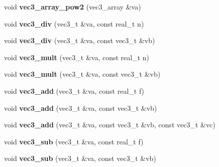 \begin{DoxyCompactItemize}
\item 
void {\bfseries vec3\+\_\+array\+\_\+pow2} (vec3\+\_\+array \&va)\hypertarget{namespacekukadu_a650138c56420ea9479f90f0b67767956}{}\label{namespacekukadu_a650138c56420ea9479f90f0b67767956}

\item 
void {\bfseries vec3\+\_\+div} (vec3\+\_\+t \&va, const real\+\_\+t n)\hypertarget{namespacekukadu_a743bd59f2d8a3dc59e907c7280362eb6}{}\label{namespacekukadu_a743bd59f2d8a3dc59e907c7280362eb6}

\item 
void {\bfseries vec3\+\_\+div} (vec3\+\_\+t \&va, const vec3\+\_\+t \&vb)\hypertarget{namespacekukadu_a9405d0487db8c6245a8cee6c0093b7a2}{}\label{namespacekukadu_a9405d0487db8c6245a8cee6c0093b7a2}

\item 
void {\bfseries vec3\+\_\+mult} (vec3\+\_\+t \&va, const real\+\_\+t n)\hypertarget{namespacekukadu_a31703a52c47c1fc5e9ba834e86f4158c}{}\label{namespacekukadu_a31703a52c47c1fc5e9ba834e86f4158c}

\item 
void {\bfseries vec3\+\_\+mult} (vec3\+\_\+t \&va, const vec3\+\_\+t \&vb)\hypertarget{namespacekukadu_ad6a304d8720585a56356dc182b2937fb}{}\label{namespacekukadu_ad6a304d8720585a56356dc182b2937fb}

\item 
void {\bfseries vec3\+\_\+add} (vec3\+\_\+t \&va, const real\+\_\+t f)\hypertarget{namespacekukadu_aa90c74f3a7078cd1a55f6ddc2a8e6bd2}{}\label{namespacekukadu_aa90c74f3a7078cd1a55f6ddc2a8e6bd2}

\item 
void {\bfseries vec3\+\_\+add} (vec3\+\_\+t \&va, const vec3\+\_\+t \&vb)\hypertarget{namespacekukadu_a2d5f39ee05edc53f7388b8c4b95e2b1a}{}\label{namespacekukadu_a2d5f39ee05edc53f7388b8c4b95e2b1a}

\item 
void {\bfseries vec3\+\_\+add} (vec3\+\_\+t \&va, const vec3\+\_\+t \&vb, const vec3\+\_\+t \&vc)\hypertarget{namespacekukadu_aaf4dc56e9a991654c9eac6c9b08736a9}{}\label{namespacekukadu_aaf4dc56e9a991654c9eac6c9b08736a9}

\item 
void {\bfseries vec3\+\_\+sub} (vec3\+\_\+t \&va, const real\+\_\+t f)\hypertarget{namespacekukadu_a0c8be743e9b70791b1ac51f96a16b045}{}\label{namespacekukadu_a0c8be743e9b70791b1ac51f96a16b045}

\item 
void {\bfseries vec3\+\_\+sub} (vec3\+\_\+t \&va, const vec3\+\_\+t \&vb)\hypertarget{namespacekukadu_a6d6e0647d609e495b86fc50c4381ab03}{}\label{namespacekukadu_a6d6e0647d609e495b86fc50c4381ab03}


\end{DoxyCompactItemize}
